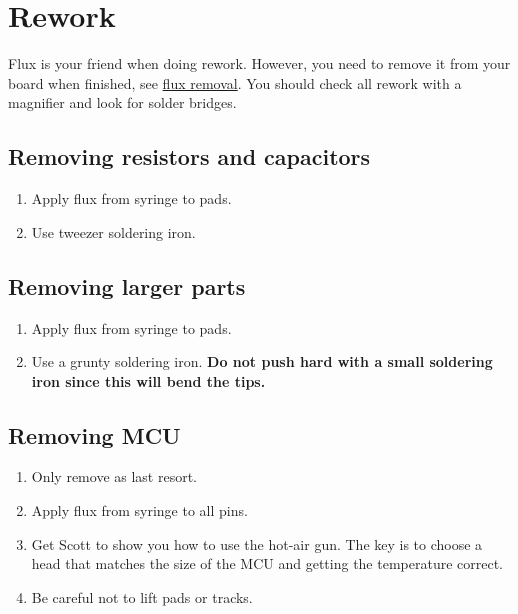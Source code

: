 \chapter{Rework}
\label{rework}


Flux is your friend when doing rework.  However, you need to remove it
from your board when finished, see \hyperref[flux removal]{flux
  removal}.  You should check all rework with a magnifier and look for
solder bridges.


\section{Removing resistors and capacitors}

\begin{enumerate}
\item Apply flux from syringe to pads.

\item Use tweezer soldering iron.
\end{enumerate}


\section{Removing larger parts}


\begin{enumerate}
\item Apply flux from syringe to pads.

\item Use a grunty soldering iron.  \textbf{Do not push hard with a
  small soldering iron since this will bend the tips.}
\end{enumerate}



\section{Removing MCU}

\begin{enumerate}
\item Only remove as last resort.

\item Apply flux from syringe to all pins.

\item Get Scott to show you how to use the hot-air gun.  The key is to
  choose a head that matches the size of the MCU and getting the
  temperature correct.

\item Be careful not to lift pads or tracks.
\end{enumerate}




